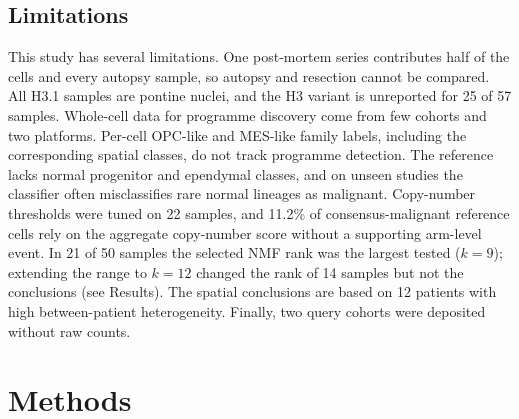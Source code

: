 \documentclass[11pt,a4paper]{article}
\begin{document}
\subsection{Limitations}

This study has several limitations. One post-mortem series contributes half of the cells and every autopsy sample, so
autopsy and resection cannot be compared. All H3.1 samples are pontine nuclei, and the H3 variant is unreported for 25
of 57 samples. Whole-cell data for programme discovery come from few cohorts and two platforms. Per-cell OPC-like and
MES-like family labels, including the corresponding spatial classes, do not track programme detection. The reference lacks normal progenitor
and ependymal classes, and on unseen studies the classifier often misclassifies rare normal lineages as malignant.
Copy-number thresholds were tuned on 22 samples, and 11.2\% of consensus-malignant reference cells rely on the
aggregate copy-number score without a supporting arm-level event. In 21 of 50 samples the selected NMF rank was the
largest tested ($k = 9$); extending the range to $k = 12$ changed the rank of 14 samples but not the conclusions (see
Results). The spatial conclusions are based on 12 patients with high between-patient
heterogeneity. Finally, two query cohorts were deposited without raw counts.

\section{Methods}
\end{document}
